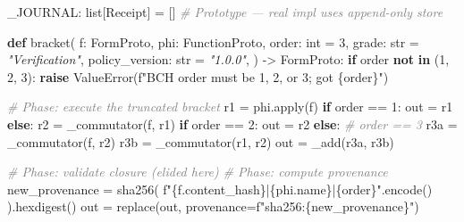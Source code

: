\documentclass[11pt,a4paper]{article}
\newenvironment{Shaded}{\begin{snugshade}\small}{\end{snugshade}}
\newcommand{\KeywordTok}[1]{\textbf{#1}}
\newcommand{\DecValTok}[1]{#1}
\newcommand{\SpecialCharTok}[1]{#1}
\newcommand{\StringTok}[1]{\textit{#1}}
\newcommand{\SpecialStringTok}[1]{#1}
\newcommand{\CommentTok}[1]{\textit{\textcolor{gray}{#1}}}
\newcommand{\ControlFlowTok}[1]{\textbf{#1}}
\newcommand{\OperatorTok}[1]{#1}
\newcommand{\BuiltInTok}[1]{#1}
\newcommand{\PreprocessorTok}[1]{#1}
\newcommand{\NormalTok}[1]{#1}
\begin{document}
\begin{Shaded}
\begin{Highlighting}[]
\NormalTok{\_JOURNAL: }\BuiltInTok{list}\NormalTok{[Receipt] }\OperatorTok{=}\NormalTok{ []  }\CommentTok{\# Prototype --- real impl uses append{-}only store}

\KeywordTok{def}\NormalTok{ bracket(}
\NormalTok{    f: FormProto,}
\NormalTok{    phi: FunctionProto,}
\NormalTok{    order: }\BuiltInTok{int} \OperatorTok{=} \DecValTok{3}\NormalTok{,}
\NormalTok{    grade: }\BuiltInTok{str} \OperatorTok{=} \StringTok{"Verification"}\NormalTok{,}
\NormalTok{    policy\_version: }\BuiltInTok{str} \OperatorTok{=} \StringTok{"1.0.0"}\NormalTok{,}
\NormalTok{) }\OperatorTok{{-}\textgreater{}}\NormalTok{ FormProto:}
    \ControlFlowTok{if}\NormalTok{ order }\KeywordTok{not} \KeywordTok{in}\NormalTok{ (}\DecValTok{1}\NormalTok{, }\DecValTok{2}\NormalTok{, }\DecValTok{3}\NormalTok{):}
        \ControlFlowTok{raise} \PreprocessorTok{ValueError}\NormalTok{(}\SpecialStringTok{f"BCH order must be 1, 2, or 3; got }\SpecialCharTok{\{}\NormalTok{order}\SpecialCharTok{\}}\SpecialStringTok{"}\NormalTok{)}

    \CommentTok{\# Phase: execute the truncated bracket}
\NormalTok{    r1 }\OperatorTok{=}\NormalTok{ phi.}\BuiltInTok{apply}\NormalTok{(f)}
    \ControlFlowTok{if}\NormalTok{ order }\OperatorTok{==} \DecValTok{1}\NormalTok{:}
\NormalTok{        out }\OperatorTok{=}\NormalTok{ r1}
    \ControlFlowTok{else}\NormalTok{:}
\NormalTok{        r2 }\OperatorTok{=}\NormalTok{ \_commutator(f, r1)}
        \ControlFlowTok{if}\NormalTok{ order }\OperatorTok{==} \DecValTok{2}\NormalTok{:}
\NormalTok{            out }\OperatorTok{=}\NormalTok{ r2}
        \ControlFlowTok{else}\NormalTok{:  }\CommentTok{\# order == 3}
\NormalTok{            r3a }\OperatorTok{=}\NormalTok{ \_commutator(f, r2)}
\NormalTok{            r3b }\OperatorTok{=}\NormalTok{ \_commutator(r1, r2)}
\NormalTok{            out }\OperatorTok{=}\NormalTok{ \_add(r3a, r3b)}

    \CommentTok{\# Phase: validate closure (elided here)}
    \CommentTok{\# Phase: compute provenance}
\NormalTok{    new\_provenance }\OperatorTok{=}\NormalTok{ sha256(}
        \SpecialStringTok{f"}\SpecialCharTok{\{}\NormalTok{f}\SpecialCharTok{.}\NormalTok{content\_hash}\SpecialCharTok{\}}\SpecialStringTok{|}\SpecialCharTok{\{}\NormalTok{phi}\SpecialCharTok{.}\NormalTok{name}\SpecialCharTok{\}}\SpecialStringTok{|}\SpecialCharTok{\{}\NormalTok{order}\SpecialCharTok{\}}\SpecialStringTok{"}\NormalTok{.encode()}
\NormalTok{    ).hexdigest()}
\NormalTok{    out }\OperatorTok{=}\NormalTok{ replace(out, provenance}\OperatorTok{=}\SpecialStringTok{f"sha256:}\SpecialCharTok{\{}\NormalTok{new\_provenance}\SpecialCharTok{\}}\SpecialStringTok{"}\NormalTok{)}


\end{Highlighting}
\end{Shaded}
\end{document}
